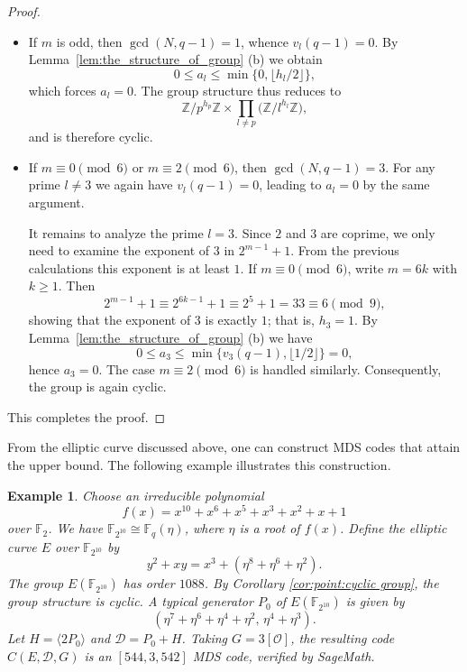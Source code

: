 \documentclass[journal,12pt,onecolumn]{IEEEtran}
\newtheorem{example}[theorem]{Example}
\begin{document}
\begin{proof}
\begin{itemize}
    \item[(i)] If $m$ is odd, then $\gcd(N, q-1) = 1$, whence $v_l(q-1) = 0$. By Lemma~\ref{lem:the_structure_of_group} (b) we obtain
    \[
    0 \le a_l \le \min\{0, \lfloor h_l/2 \rfloor\},
    \]
    which forces $a_l = 0$. The group structure thus reduces to
    \[
    \mathbb{Z} / p^{h_p} \mathbb{Z} \times \prod_{l \neq p} \bigl( \mathbb{Z} / l^{h_l} \mathbb{Z} \bigr),
    \]
    and is therefore cyclic.

    \item[(ii)] If $m \equiv 0 \pmod{6}$ or $m \equiv 2 \pmod{6}$, then $\gcd(N, q-1) = 3$. For any prime $l \neq 3$ we again have $v_l(q-1) = 0$, leading to $a_l = 0$ by the same argument.

    It remains to analyze the prime $l = 3$. Since $2$ and $3$ are coprime, we only need to examine the exponent of $3$ in $2^{m-1}+1$. From the previous calculations this exponent is at least $1$. If $m \equiv 0 \pmod{6}$, write $m = 6k$ with $k \ge 1$. Then
    \[
    2^{m-1}+1 \equiv 2^{6k-1}+1 \equiv 2^5+1 = 33 \equiv 6 \pmod{9},
    \]
    showing that the exponent of $3$ is exactly $1$; that is, $h_3 = 1$. By Lemma~\ref{lem:the_structure_of_group} (b) we have
    \[
    0 \le a_3 \le \min\{v_3(q-1), \lfloor 1/2 \rfloor\} = 0,
    \]
    hence $a_3 = 0$. The case $m \equiv 2 \pmod{6}$ is handled similarly. Consequently, the group is again cyclic.
\end{itemize}

This completes the proof.
\end{proof}

From the elliptic curve discussed above, one can construct MDS codes that attain the upper bound. The following example illustrates this construction.

\begin{example}
Choose an irreducible polynomial 
\[ f(x) = x^{10} + x^6 + x^5 + x^3 + x^2 + x + 1\]
over $\mathbb{F}_2$.
We have $ \mathbb{F}_{2^{10}} \cong \mathbb{F}_q (\eta) $, where $\eta$ is a root of $f(x)$. Define the elliptic curve $E$ over $\mathbb{F}_{2^{10}}$ by
\[
y^2 + xy = x^3 + (\eta^8 + \eta^6 + \eta^2).
\]
The group $E(\mathbb{F}_{2^{10}})$ has order $1088$. By Corollary \ref{cor:point:cyclic group}, the group structure is cyclic. A typical generator $P_0$ of $E(\mathbb{F}_{2^{10}})$ is given by
\[
(\eta^7 + \eta^6 + \eta^4 + \eta^2 ,\, \eta^4 + \eta^3).
\]
Let $H = \langle 2 P_0 \rangle$ and $\mathcal{D} = P_0 + H$. Taking $G = 3[\mathcal{O}]$, the resulting code $C(E, \mathcal{D}, G)$ is an $[544,3,542]$ MDS code, verified by SageMath.
\end{example}
\end{document}

